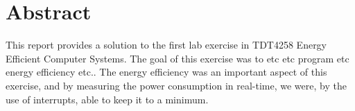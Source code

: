 \section{Abstract}

This report provides a solution to the first lab exercise in TDT4258 Energy Efficient
Computer Systems. The goal of this exercise was to etc etc program etc energy efficiency etc.. The energy efficiency was an important aspect of this exercise, and by measuring the power consumption in real-time, we were, by the use of interrupts, able to keep it to a minimum.
